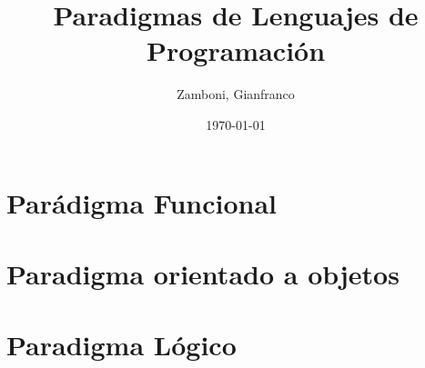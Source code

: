 \documentclass[10pt,a4paper]{article}
\begin{document}
\title{Paradigmas de Lenguajes de Programación}

\date{\today}

\author{Zamboni, Gianfranco}
\begin{titlepage}
    \maketitle
    \thispagestyle{empty}
    \tableofcontents
\end{titlepage}

\newpage
\setcounter{page}{1}


\newpage
\part{Parádigma Funcional}



\newpage


\newpage


\newpage


\newpage
\part{Paradigma orientado a objetos}


\newpage


\newpage


\newpage
\part{Paradigma Lógico}

\appendix
\newpage

\end{document}

